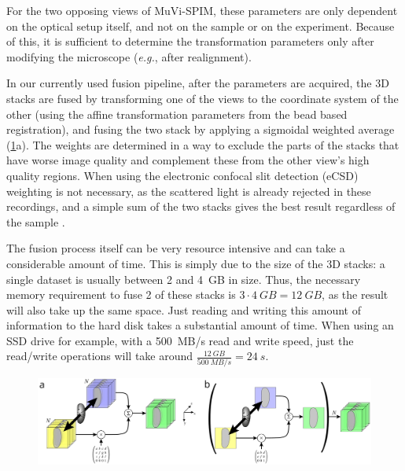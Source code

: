 For the two opposing views of MuVi-SPIM, these parameters are only dependent on the optical setup itself, and not on the sample or on the experiment. Because of this, it is sufficient to determine the transformation parameters only after modifying the microscope (\textit{e.g.}, after realignment).

In our currently used fusion pipeline, after the parameters are acquired, the 3D stacks are fused by transforming one of the views to the coordinate system of the other (using the affine transformation parameters from the bead based registration), and fusing the two stack by applying a sigmoidal weighted average (\ref{fig:acquisition}a). The weights are determined in a way to exclude the parts of the stacks that have worse image quality and complement these from the other view's high quality regions. When using the electronic confocal slit detection (eCSD) weighting is not necessary, as the scattered light is already rejected in these recordings, and a simple sum of the two stacks gives the best result regardless of the sample \cite{de_medeiros_confocal_2015}.

The fusion process itself can be very resource intensive and can take a considerable amount of time. This is simply due to the size of the 3D stacks: a single dataset is usually between 2 and \SI{4}{GB} in size. Thus, the necessary memory requirement to fuse 2 of these stacks is $3\cdot \SI{4}{GB} = \SI{12}{GB}$, as the result will also take up the same space. Just reading and writing this amount of information to the hard disk takes a substantial amount of time. When using an SSD drive for example, with a \SI{500}{MB/s} read and write speed, just the read/write operations will take around $\frac{\SI{12}{GB}}{\SI{500}{MB/s}} = \SI{24}{s}$.


\begin{figure}
  \centering
  \includegraphics[width=1\columnwidth]{fusion/acquisition}
  \label{fig:acquisition}
\end{figure}

